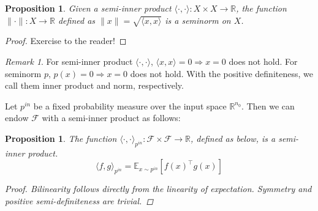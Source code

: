 \documentclass{article}
\theoremstyle{plain}
\newtheorem{proposition}[theorem]{Proposition}
\theoremstyle{definition}
\theoremstyle{remark}
\newtheorem{remark}{Remark}
\begin{document}
\begin{proposition}
	Given a semi-inner product $\langle \cdot, \cdot \rangle : X \times X \rightarrow \mathbb{R}$, the function $\lVert \cdot \rVert : X \rightarrow \mathbb{R}$ defined as $\lVert x \rVert = \sqrt{\langle x, x \rangle}$ is a seminorm on $X$.
\end{proposition}
\begin{proof}
	Exercise to the reader!
%		
\end{proof}

\begin{remark}
	For semi-inner product $\langle \cdot, \cdot \rangle$, $\langle x, x \rangle = 0 \Rightarrow x = 0$ does not hold.
	For seminorm $p$, $p(x) = 0 \Rightarrow x = 0$ does not hold.
	With the positive definiteness, we call them inner product and norm, respectively.
\end{remark}


Let $p^{in}$ be a fixed probability measure over the input space $\mathbb{R}^{n_0}$.
Then we can endow $\mathcal{F}$ with a semi-inner product as follows:
\begin{proposition}
	The function $\langle \cdot, \cdot \rangle_{p^{in}} : \mathcal{F} \times \mathcal{F} \rightarrow \mathbb{R}$, defined as below, is a semi-inner product.
	\begin{equation}
		\langle f, g \rangle_{p^{in}} = \mathbb{E}_{x \sim p^{in}} \left[ f(x)^\intercal g(x) \right]
	\end{equation}
	\begin{proof}
		Bilinearity follows directly from the linearity of expectation.
		Symmetry and positive semi-definiteness are trivial.
	\end{proof}
\end{proposition}
\end{document}
